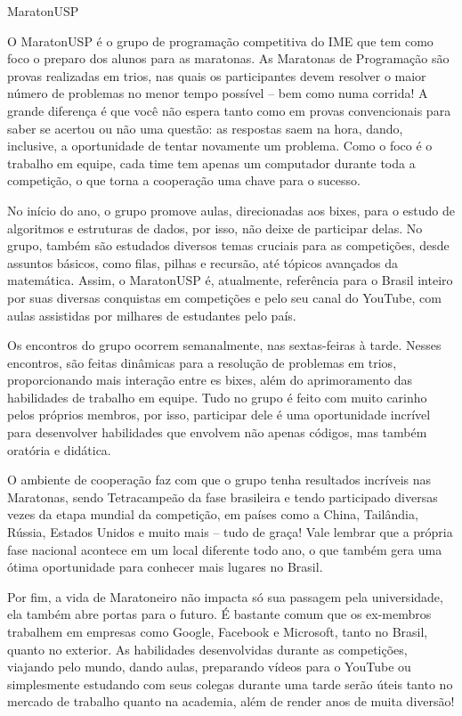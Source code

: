 \begin{subsecao}{MaratonUSP}


O MaratonUSP é o grupo de programação competitiva do IME que tem como foco o
preparo dos alunos para as maratonas. As Maratonas de Programação são provas
realizadas em trios, nas quais os participantes devem resolver o maior número
de problemas no menor tempo possível -- bem como numa corrida! A grande
diferença é que você não espera tanto como em provas convencionais para saber
se acertou ou não uma questão: as respostas saem na hora, dando, inclusive, a
oportunidade de tentar novamente um problema. Como o foco é o trabalho em
equipe, cada time tem apenas um computador durante toda a competição, o que
torna a cooperação uma chave para o sucesso.

No início do ano, o grupo promove aulas, direcionadas aos bixes, 
para o estudo de algoritmos e estruturas de dados, por isso, não deixe de
participar delas. No grupo, também são estudados diversos temas cruciais para
as competições, desde assuntos básicos, como filas, pilhas e recursão, até tópicos
avançados da matemática. Assim, o MaratonUSP é, atualmente, referência para o
Brasil inteiro por suas diversas conquistas em competições e pelo seu canal do
YouTube, com aulas assistidas por milhares de estudantes pelo país.

Os encontros do grupo ocorrem semanalmente, nas sextas-feiras à tarde. Nesses
encontros, são feitas dinâmicas para a resolução de problemas em trios,
proporcionando mais interação entre es bixes, além do aprimoramento das habilidades
de trabalho em equipe. Tudo no grupo é feito com muito carinho pelos próprios
membros, por isso, participar dele é uma oportunidade incrível para desenvolver
habilidades que envolvem não apenas códigos, mas também oratória e didática.

O ambiente de cooperação faz com que o grupo tenha resultados incríveis nas
Maratonas, sendo Tetracampeão da fase brasileira e tendo participado diversas
vezes da etapa mundial da competição, em países como a China, Tailândia,
Rússia, Estados Unidos e muito mais -- tudo de graça! Vale lembrar que a própria
fase nacional acontece em um local diferente todo ano, o que também gera uma ótima
oportunidade para conhecer mais lugares no Brasil.

Por fim, a vida de Maratoneiro não impacta só sua passagem pela universidade,
ela também abre portas para o futuro. É bastante comum que os ex-membros
trabalhem em empresas como Google, Facebook e Microsoft, tanto no Brasil,
quanto no exterior. As habilidades desenvolvidas durante as competições,
viajando pelo mundo, dando aulas, preparando vídeos para o YouTube ou
simplesmente estudando com seus colegas durante uma tarde serão úteis tanto no
mercado de trabalho quanto na academia, além de render anos de muita diversão!


\end{subsecao}
